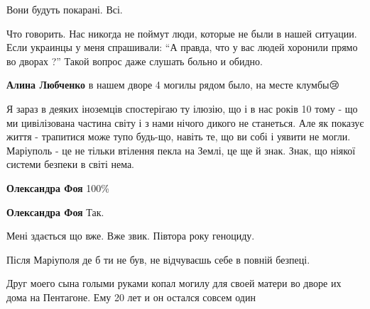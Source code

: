 
 
 
 
 

\qqSecCmt


Вони будуть покарані. Всі.


Что говорить. Нас никогда не поймут люди, которые не были в нашей ситуации.
Если украинцы у меня спрашивали: \enquote{А правда, что у вас людей хоронили прямо во
дворах ?} Такой вопрос даже слушать больно и обидно.

\begin{itemize} %
\textbf{Алина Любченко} в нашем дворе 4 могилы рядом было, на месте клумбы😢
\end{itemize} %


Я зараз в деяких іноземців спостерігаю ту ілюзію, що і в нас років 10 тому - що
ми цивілізована частина світу і з нами нічого дикого не станеться. Але як
показує життя - трапитися може тупо будь-що, навіть те, що ви собі і уявити не
могли. Маріуполь - це не тільки втілення пекла на Землі, це ще й знак. Знак, що
ніякої системи безпеки в світі нема.

\begin{itemize} %
\textbf{Олександра Фоя} 100\%

\textbf{Олександра Фоя} Так.
\end{itemize} %


Мені здається що вже. Вже звик. Півтора року геноциду.


Після Маріуполя де б ти не був, не відчуваєшь себе в повній безпеці.


Друг моего сына голыми руками копал могилу для своей матери во дворе их дома на
Пентагоне. Ему 20 лет и он остался совсем один

